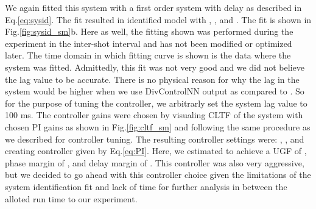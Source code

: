 We again fitted this system with a first order system with delay as described in Eq.\ref{eq:sysid}.
The fit resulted in identified model with \SMK, \SMTau, and \SML.
The fit is shown in Fig.\ref{fig:sysid_sm}b.
Here as well, the fitting shown was performed during the experiment in the inter-shot interval and has not been modified or optimized later.
The time domain in which fitting curve is shown is the data where the system was fitted.
Admittedly, this fit was not very good and we did not believe the lag value to be accurate.
There is no physical reason for why the lag in the system would be higher when we use DivControlNN output as compared to \Afrac.
So for the purpose of tuning the controller, we arbitrarly set the system lag value to 100 ms.
The controller gains were chosen by visualing \ac{CLTF} of the system with chosen PI gains as shown in Fig.\ref{fig:cltf_sm} and following the same procedure as we described for \Afrac controller tuning.
The resulting controller settings were: \SMKp, \SMTi, and \SMstau{} creating controller given by Eq.\ref{eq:PI}.
Here, we estimated to achieve a \ac{UGF} of \SMUGF, phase margin of \SMPhaseMargin, and delay margin of \SMDelayMargin.
This controller was also very aggressive, but we decided to go ahead with this controller choice given the limitations of the system identification fit and lack of time for further analysis in between the alloted run time to our experiment.
